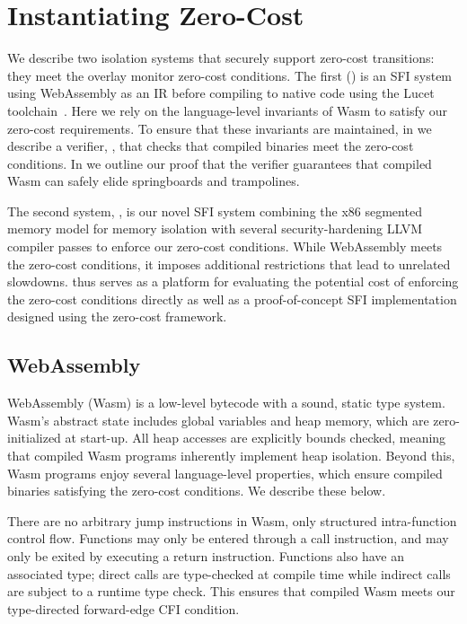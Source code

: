 \section{Instantiating Zero-Cost}
\label{sec:implementation-security}

We describe two isolation systems that securely support zero-cost transitions:
they meet the overlay monitor zero-cost conditions.
%
The first () is an SFI system using
WebAssembly as an IR before compiling to native code using the Lucet
toolchain~\cite{lucet}.
%
Here we rely on the language-level invariants of Wasm to satisfy our
zero-cost requirements.
%
To ensure that these invariants are maintained, in
 we describe a verifier, \verifname, that checks
that compiled binaries meet the zero-cost conditions.
%
In  we outline our proof that the verifier guarantees
that compiled Wasm can safely elide springboards and trampolines.

The second system, \trsegmentsfi, is our novel SFI system combining
the x86 segmented memory model for memory isolation with several
security-hardening LLVM compiler passes to enforce our zero-cost conditions.
%
While WebAssembly meets the zero-cost conditions, it imposes additional
restrictions that lead to unrelated slowdowns.
%
\trsegmentsfi thus serves as a platform for evaluating the potential cost of
enforcing the zero-cost conditions directly as well as a proof-of-concept
SFI implementation designed using the zero-cost framework.

\subsection{WebAssembly}
\label{sec:web-assembly-secure}

WebAssembly (Wasm) is a low-level bytecode with a sound, static type system.
%
Wasm's abstract state includes global variables 
and heap memory, which are zero-initialized at start-up.
%
All heap accesses are explicitly bounds checked, 
meaning that compiled Wasm programs inherently 
implement heap isolation.
%
Beyond this, Wasm programs enjoy several language-level properties, which ensure
compiled binaries satisfying the zero-cost conditions.
%
We describe these below.

%
There are no arbitrary jump instructions in Wasm, only structured intra-function
control flow.
%
Functions may only be entered through a call instruction, and may only be exited
by executing a return instruction.
%
Functions also have an associated type; direct calls are type-checked at
compile time while indirect calls are subject to a runtime type check.
%
This ensures that compiled Wasm meets our type-directed forward-edge CFI condition.

